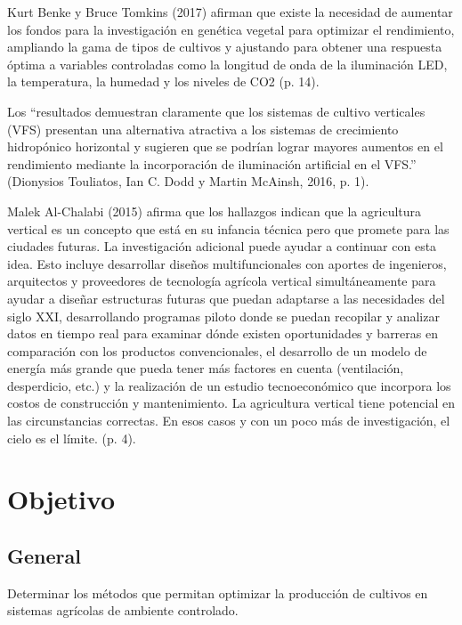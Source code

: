 \documentclass{report}
\begin{document}
Kurt Benke y Bruce Tomkins (2017) afirman que existe la necesidad de aumentar
los fondos para la investigación en genética vegetal para optimizar el
rendimiento, ampliando la gama de tipos de cultivos y ajustando para obtener una
respuesta óptima a variables controladas como la longitud de onda de la
iluminación LED, la temperatura, la humedad y los niveles de CO2 (p. 14).

Los ``resultados demuestran claramente que los sistemas de cultivo
verticales (VFS) presentan una alternativa atractiva a los sistemas de
crecimiento hidropónico horizontal y sugieren que se podrían lograr mayores
aumentos en el rendimiento mediante la incorporación de iluminación artificial
en el VFS.'' (Dionysios Touliatos, Ian C. Dodd y Martin McAinsh, 2016, p. 1).

Malek Al-Chalabi (2015) afirma que los hallazgos indican que la agricultura
vertical es un concepto que está en su infancia técnica pero que promete para
las ciudades futuras. La investigación adicional puede ayudar a continuar con
esta idea. Esto incluye desarrollar diseños multifuncionales con aportes de
ingenieros, arquitectos y proveedores de tecnología agrícola vertical
simultáneamente para ayudar a diseñar estructuras futuras que puedan adaptarse a
las necesidades del siglo XXI, desarrollando programas piloto donde se puedan
recopilar y analizar datos en tiempo real para examinar dónde existen
oportunidades y barreras en comparación con los productos convencionales, el
desarrollo de un modelo de energía más grande que pueda tener más factores en
cuenta (ventilación, desperdicio, etc.) y la realización de un estudio
tecnoeconómico que incorpora los costos de construcción y mantenimiento.
La agricultura vertical tiene potencial en las circunstancias correctas. En esos
casos y con un poco más de investigación, el cielo es el límite. (p. 4).
\section{Objetivo}
\subsection{General}
Determinar los métodos que permitan optimizar la producción de cultivos en
sistemas agrícolas de ambiente controlado.
\end{document}

